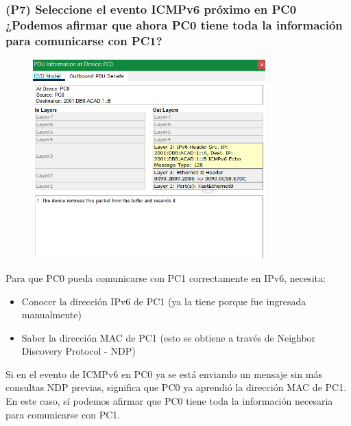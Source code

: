 \documentclass{article}
\begin{document}
\subsubsection*{(P7)  Seleccione el evento ICMPv6 próximo en PC0 ¿Podemos afirmar que ahora PC0 tiene toda la información para comunicarse con PC1?
}
\begin{figure}[h]
    \centering
    \includegraphics[width=0.8\textwidth]{19.png}
\end{figure}

Para que PC0 pueda comunicarse con PC1 correctamente en IPv6, necesita:
\begin{itemize}
\item Conocer la dirección IPv6 de PC1 (ya la tiene porque fue ingresada manualmente)
\item Saber la dirección MAC de PC1 (esto se obtiene a través de Neighbor Discovery Protocol - NDP)
\end{itemize}

Si en el evento de ICMPv6 en PC0 ya se está enviando un mensaje sin más consultas NDP previas, significa que PC0 ya aprendió la dirección MAC de PC1. En este caso, sí podemos afirmar que PC0 tiene toda la información necesaria para comunicarse con PC1.
\end{document}
